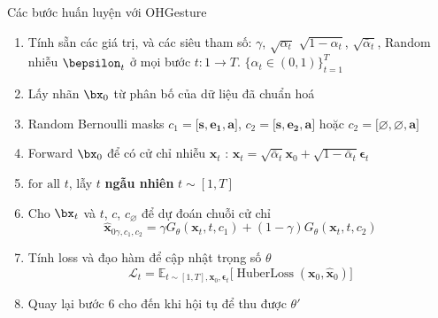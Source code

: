 \begin{frame}{Các bước huấn luyện với OHGesture}
	\begin{enumerate}
		\item Tính sẵn các giá trị, và các siêu tham số: $\gamma$, $\sqrt{\alpha_t}$ $\sqrt{1 - \alpha_t}$, $\sqrt{\bar{\alpha}_t}$, Random nhiễu $\bepsilon_t$ ở mọi bước $t: 1 \rightarrow T$.
		$\{\alpha_t \in (0, 1)\}_{t=1}^T$
		\item Lấy nhãn $\bx_0$ từ phân bố của dữ liệu đã chuẩn hoá
		\item Random Bernoulli masks  $c_{1} = \big[ \mathbf{s} , \mathbf{e_1}, \mathbf{a} \big]$, $c_{2} = \big[ \mathbf{s} , \mathbf{e_2}, \mathbf{a}\big]$ hoặc $c_{2} = \big[ \varnothing , \varnothing, \mathbf{a} \big]$
		\item Forward $\bx_0$ để có cử chỉ nhiễu $\mathbf{x}_t$ :  $\mathbf{x}_t = \sqrt{\bar{\alpha}_t}\mathbf{x}_0 + \sqrt{1 - \bar{\alpha}_t}\boldsymbol{\epsilon}_t$
		\item $\text{for all}$ $t$, lẫy $t$ \textbf{ngẫu nhiên} $t \sim [1, T]$
		\item Cho $\bx_t$ và $t$, $c$, $c_{\varnothing}$ để dự đoán chuỗi cử chỉ
		\begin{equation}
			\hat{\mathbf{x}}_{0 \gamma, c_{1}, c_{2}}=\gamma G_{\theta} \left(\mathbf{x}_{t}, t, c_{1}\right)+(1-\gamma) G_{\theta} \left(\mathbf{x}_{t}, t, c_{2}\right)
		\end{equation}
		\item Tính loss và đạo hàm để cập nhật trọng số $\theta$
		\begin{equation}
			\mathcal{L}_t = \mathbb{E}_{t \sim [1, T], \mathbf{x}_0, \boldsymbol{\epsilon}_t} \Big[ \operatorname{HuberLoss}(\mathbf{x}_0, \hat{\mathbf{x}}_0 ) \Big]
		\end{equation}
	
	
		\item Quay lại bước 6 cho đến khi hội tụ để thu được $\theta'$
	\end{enumerate}
\end{frame}

